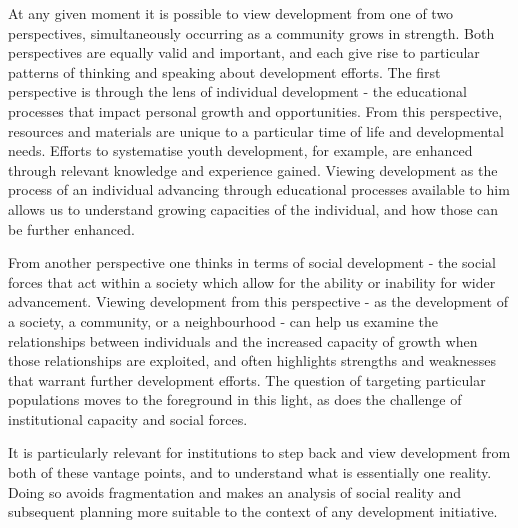 At any given moment it is possible to view development from one of two perspectives, simultaneously occurring as a community grows in strength. Both perspectives are equally valid and important, and each give rise to particular patterns of thinking and speaking about development efforts. The first perspective is through the lens of individual development - the educational processes that impact personal growth and opportunities. From this perspective, resources and materials are unique to a particular time of life and developmental needs. Efforts to systematise youth development, for example, are enhanced through relevant knowledge and experience gained. Viewing development as the process of an individual advancing through educational processes available to him allows us to understand growing capacities of the individual, and how those can be further enhanced. 

From another perspective one thinks in terms of social development - the social forces that act within a society which allow for the ability or inability for wider advancement. Viewing development from this perspective - as the development of a society, a community, or a neighbourhood - can help us examine the relationships between individuals and the increased capacity of growth when those relationships are exploited, and often highlights strengths and weaknesses that warrant further development efforts. The question of targeting particular populations moves to the foreground in this light, as does the challenge of institutional capacity and social forces. 

It is particularly relevant for institutions to step back and view development from both of these vantage points, and to understand what is essentially one reality. Doing so avoids fragmentation and makes an analysis of social reality and subsequent planning more suitable to the context of any development initiative. 

